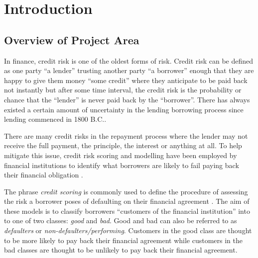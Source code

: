 
\chapter{Introduction} %

\label{Chapter1} %


\section*{Overview of Project Area}

In finance, credit risk is one of the oldest forms of risk. Credit risk can be defined as one party ``a lender'' trusting another party ``a borrower'' enough that they are happy to give them money ``some credit'' where they anticipate to be paid back not instantly but after some time interval, the credit risk is the probability or chance that the ``lender'' is never paid back by the ``borrower''. There has always existed a certain amount of uncertainty in the lending borrowing process since lending commenced in 1800 B.C.\citep{caouette_managing_1998}.

There are many credit risks in the repayment process where the lender may not receive the full payment, the principle, the interest or anything at all. To help mitigate this issue, credit risk scoring and modelling have been employed by financial institutions to identify what borrowers are likely to fail paying back their financial obligation \citep{sirirattanaphonkun_default_2012}.

The phrase \textit{credit scoring} is commonly used to define the procedure of assessing the risk a borrower poses of defaulting on their financial agreement \citep{hand_statistical_1997}. The aim of these models is to classify borrowers ``customers of the financial institution'' into to one of two classes: \textit{good} and \textit{bad}. Good and bad can also be referred to as \textit{defaulters} or \textit{non-defaulters/performing}. Customers in the good class are thought to be more likely to pay back their financial agreement while customers in the bad classes are thought to be unlikely to pay back their financial agreement. 

